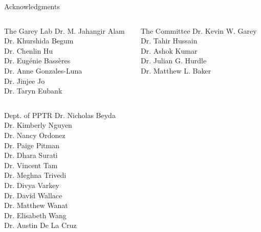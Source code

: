 \begin{frame}{Acknowledgments} \tiny
\begin{columns}[T] %
  \begin{column}{0.3\textwidth}
    \begin{block}{The Garey Lab}
      Dr. M. Jahangir Alam \\ 
      Dr. Khurshida Begum \\ 
      Dr. Chenlin Hu \\
      Dr. Eugénie Bassères \\
      Dr. Anne Gonzales-Luna \\
      Dr. Jinjee Jo \\
      Dr. Taryn Eubank \\
    \end{block}
  \end{column}
  \begin{column}{0.5\textwidth}
    \begin{block}{The Committee}
      Dr. Kevin W. Garey \\
      Dr. Tahir Hussain \\ 
      Dr. Ashok Kumar \\ 
      Dr. Julian G. Hurdle \\
      Dr. Matthew L. Baker \\
    \end{block}
  \end{column}
\end{columns}
\vfill %
\begin{columns}[T]
  \begin{column}{0.3\textwidth}
    \begin{block}{Dept. of PPTR}
      Dr. Nicholas Beyda \\ 
      Dr. Kimberly Nguyen \\
      Dr. Nancy Ordonez \\
      Dr. Paige Pitman \\
      Dr. Dhara Surati \\
      Dr. Vincent Tam \\
      Dr. Meghna Trivedi \\
      Dr. Divya Varkey \\
      Dr. David Wallace \\
      Dr. Matthew Wanat \\
      Dr. Elisabeth Wang \\
      Dr. Austin De La Cruz \\

\end{block}
\end{column}
\end{columns}
\end{frame}

